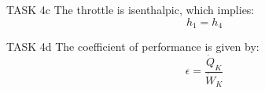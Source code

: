 TASK 4c  
The throttle is isenthalpic, which implies:  
\[
h_1 = h_4
\]

TASK 4d  
The coefficient of performance is given by:  
\[
\epsilon = \frac{\dot{Q}_K}{\dot{W}_K}
\]